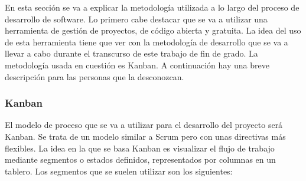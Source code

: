 En esta sección se va a explicar la metodología utilizada a lo largo del proceso de desarrollo de software. Lo primero cabe destacar que se va a utilizar una herramienta de gestión de proyectos, de código abierta y gratuita. La idea del uso de esta herramienta tiene que ver con la metodología de desarrollo que se va a llevar a cabo durante el transcurso de este trabajo de fin de grado. La metodología usada en cuestión es Kanban. A continuación hay una breve descripción para las personas que la desconozcan. 

\subsubsection{Kanban}

El modelo de proceso que se va a utilizar para el desarrollo del proyecto será Kanban. Se trata de un modelo similar a Scrum pero con unas directivas más flexibles. La idea en la que se basa Kanban es visualizar el flujo de trabajo mediante segmentos o estados definidos, representados por columnas en un tablero. Los segmentos que se suelen utilizar son los siguientes:

